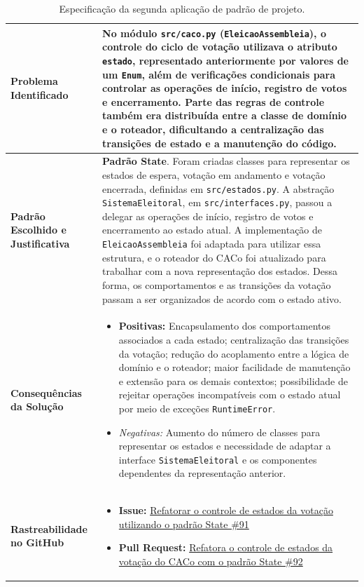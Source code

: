 \documentclass[12pt,a4paper]{article}
\begin{document}
\begin{table}[H]
\centering
\small
\begin{tabularx}{\textwidth}{|l|X|}
\hline
\textbf{Problema Identificado} &
No módulo \texttt{src/caco.py} (\texttt{EleicaoAssembleia}), o controle do ciclo de votação utilizava o atributo \texttt{estado}, representado anteriormente por valores de um \texttt{Enum}, além de verificações condicionais para controlar as operações de início, registro de votos e encerramento. Parte das regras de controle também era distribuída entre a classe de domínio e o roteador, dificultando a centralização das transições de estado e a manutenção do código. \\
\hline

\textbf{Padrão Escolhido e Justificativa} &
\textbf{Padrão State}. Foram criadas classes para representar os estados de espera, votação em andamento e votação encerrada, definidas em \texttt{src/estados.py}. A abstração \texttt{SistemaEleitoral}, em \texttt{src/interfaces.py}, passou a delegar as operações de início, registro de votos e encerramento ao estado atual. A implementação de \texttt{EleicaoAssembleia} foi adaptada para utilizar essa estrutura, e o roteador do CACo foi atualizado para trabalhar com a nova representação dos estados. Dessa forma, os comportamentos e as transições da votação passam a ser organizados de acordo com o estado ativo. \\
\hline

\textbf{Consequências da Solução} &
\begin{itemize}[leftmargin=1em, nosep]
    \item \textbf{Positivas:} Encapsulamento dos comportamentos associados a cada estado; centralização das transições da votação; redução do acoplamento entre a lógica de domínio e o roteador; maior facilidade de manutenção e extensão para os demais contextos; possibilidade de rejeitar operações incompatíveis com o estado atual por meio de exceções \texttt{RuntimeError}.
    \item \textit{Negativas:} Aumento do número de classes para representar os estados e necessidade de adaptar a interface \texttt{SistemaEleitoral} e os componentes dependentes da representação anterior.
\end{itemize} \\
\hline

\textbf{Rastreabilidade no GitHub} &
\begin{itemize}[leftmargin=1em, nosep]
    \item \textbf{Issue:} \href{https://github.com/GiizAzul/MC656/issues/91}{Refatorar o controle de estados da votação utilizando o padrão State \#91}
    \item \textbf{Pull Request:} \href{https://github.com/GiizAzul/MC656/pull/92}{Refatora o controle de estados da votação do CACo com o padrão State \#92}
\end{itemize} \\
\hline
\end{tabularx}
\caption{Especificação da segunda aplicação de padrão de projeto.}
\end{table}
\end{document}
